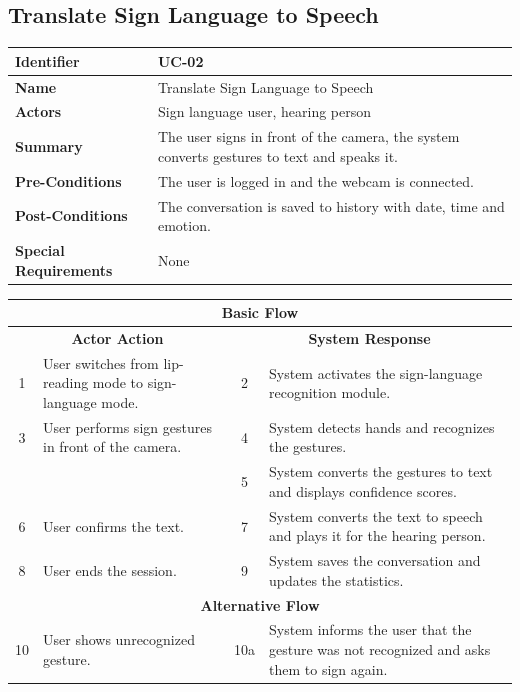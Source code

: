 \documentclass{FastFyp}
\begin{document}
\subsection{ Translate Sign Language to Speech}
\begin{table}[H]
\centering
\renewcommand{\arraystretch}{1.3}
\begin{tabularx}{\textwidth}{|l|X|}
\hline
\textbf{Identifier} & UC-02 \\ \hline
\textbf{Name} & Translate Sign Language to Speech \\ \hline
\textbf{Actors} & Sign language user, hearing person \\ \hline
\textbf{Summary} & The user signs in front of the camera, the system converts gestures to text and speaks it. \\ \hline
\textbf{Pre-Conditions} & The user is logged in and the webcam is connected. \\ \hline
\textbf{Post-Conditions} & The conversation is saved to history with date, time and emotion. \\ \hline
\textbf{Special Requirements} & None \\ \hline
\end{tabularx}

\vspace{-\arrayrulewidth}
\begin{tabularx}{\textwidth}{|c|X|c|X|}
\hline
\multicolumn{4}{|c|}{\textbf{Basic Flow}} \\ \hline
\multicolumn{2}{|c|}{\textbf{Actor Action}} & \multicolumn{2}{c|}{\textbf{System Response}} \\ \hline
1 & User switches from lip-reading mode to sign-language mode. & 2 & System activates the sign-language recognition module. \\ \hline
3 & User performs sign gestures in front of the camera. & 4 & System detects hands and recognizes the gestures. \\ \hline
 & & 5 & System converts the gestures to text and displays confidence scores. \\ \hline
6 & User confirms the text. & 7 & System converts the text to speech and plays it for the hearing person. \\ \hline
8 & User ends the session. & 9 & System saves the conversation and updates the statistics. \\ \hline
\multicolumn{4}{|c|}{\textbf{Alternative Flow}} \\ \hline
10 & User shows unrecognized gesture. & 10a & System informs the user that the gesture was not recognized and asks them to sign again. \\ \hline
\end{tabularx}
\end{table}
\end{document}
